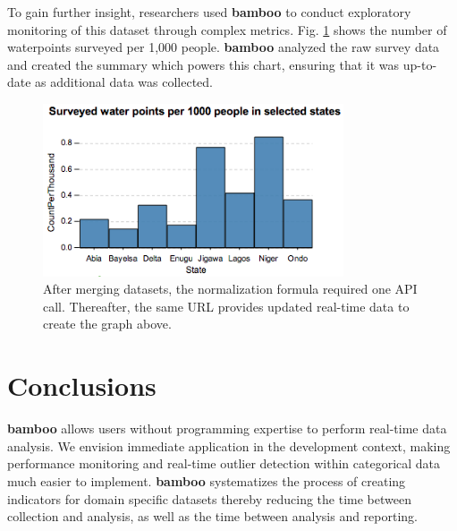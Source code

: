 \documentclass{sig-alternate}
\begin{document}
To gain further insight, researchers used
\textbf{bamboo} to conduct exploratory monitoring of this
dataset through complex metrics.  Fig. \ref{fig:summary} shows the number of
waterpoints surveyed per 1,000
people.  \textbf{bamboo} analyzed the raw survey data and created the summary
which powers this chart, ensuring that it
was up-to-date as additional data was collected.

\begin{figure}
\centering
\includegraphics[width=3.5in]{figures/summary.png}
\caption{After merging datasets, the normalization formula required one API
    call. Thereafter, the same URL provides updated real-time data to create the graph above.}
\label{fig:summary}
\end{figure}


%
%

\section{Conclusions}
\textbf{bamboo} allows users without programming expertise to perform real-time
data analysis.
We envision immediate application in the development context, making performance
monitoring \cite{berg} and real-time outlier detection within categorical data \cite{dimagi} much easier to implement. 
\textbf{bamboo} systematizes the process of creating indicators for domain specific datasets thereby reducing the time between collection and analysis, as well as the time between analysis and reporting.
\end{document}
